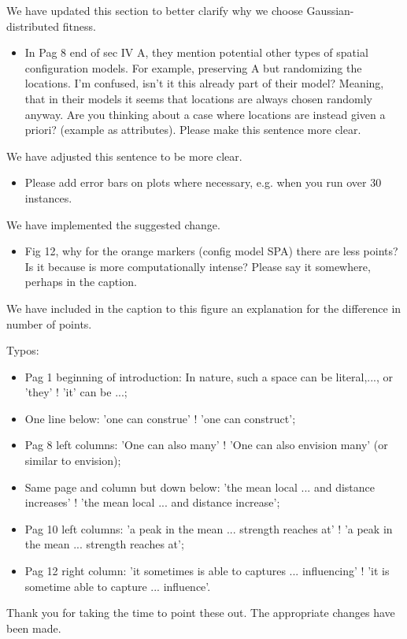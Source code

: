 \documentclass[12pt]{article}
\begin{document}
{\color{res} We have updated this section to better clarify why we choose Gaussian-distributed fitness.}

\begin{itemize}
\item In Pag 8 end of sec IV A, they mention potential other types of spatial configuration
models. For example, preserving A but randomizing the locations. I’m confused,
isn’t it this already part of their model? Meaning, that in their models it seems that
locations are always chosen randomly anyway. Are you thinking about a case where
locations are instead given a priori? (example as attributes). Please make this sentence
more clear.
\end{itemize}

{\color{res} We have adjusted this sentence to be more clear.}

\begin{itemize}
\item Please add error bars on plots where necessary, e.g. when you run over 30 instances.
\end{itemize}

{\color{res} We have implemented the suggested change.}

\begin{itemize}
\item Fig 12, why for the orange markers (config model SPA) there are less points? Is it
because is more computationally intense? Please say it somewhere, perhaps in the
caption.
\end{itemize}

{\color{res} We have included in the caption to this figure an explanation for the difference in number of points.}

\pagebreak

Typos:
\begin{itemize}
\item Pag 1 beginning of introduction: In nature, such a space can be literal,..., or ’they’ !
’it’ can be ...;
\item One line below: ’one can construe’ ! ’one can construct’;
\item Pag 8 left columns: ’One can also many’ ! ’One can also envision many’ (or similar
to envision);
\item Same page and column but down below: ’the mean local ... and distance increases’
! ’the mean local ... and distance increase’;
\item Pag 10 left columns: ’a peak in the mean ... strength reaches at’ ! ’a peak in the
mean ... strength reaches at’;
\item Pag 12 right column: ’it sometimes is able to captures ... influencing’ ! ’it is sometime
able to capture ... influence’.
\end{itemize}

{\color{res} Thank you for taking the time to point these out. The appropriate changes have been made.}
\end{document}
